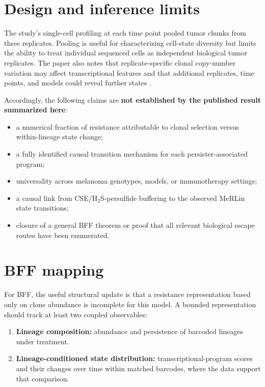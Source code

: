 \documentclass[11pt]{article}
\begin{document}
\section{Design and inference limits}

The study's single-cell profiling at each time point pooled tumor chunks from three replicates. Pooling is useful for characterizing cell-state diversity but limits the ability to treat individual sequenced cells as independent biological tumor replicates. The paper also notes that replicate-specific clonal copy-number variation may affect transcriptional features and that additional replicates, time points, and models could reveal further states \cite{Li2026}.

Accordingly, the following claims are \textbf{not established by the published result summarized here}:

\begin{itemize}[leftmargin=1.5em]
  \item a numerical fraction of resistance attributable to clonal selection versus within-lineage state change;
  \item a fully identified causal transition mechanism for each persister-associated program;
  \item universality across melanoma genotypes, models, or immunotherapy settings;
  \item a causal link from CSE/H$_2$S-persulfide buffering to the observed MeRLin state transitions;
  \item closure of a general BFF theorem or proof that all relevant biological escape routes have been enumerated.
\end{itemize}

\section{BFF mapping}

For BFF, the useful structural update is that a resistance representation based only on clone abundance is incomplete for this model. A bounded representation should track at least two coupled observables:

\begin{enumerate}[leftmargin=2em]
  \item \textbf{Lineage composition:} abundance and persistence of barcoded lineages under treatment.
  \item \textbf{Lineage-conditioned state distribution:} transcriptional-program scores and their changes over time within matched barcodes, where the data support that comparison.
\end{enumerate}
\end{document}
